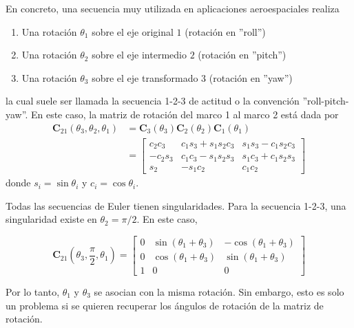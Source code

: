 En concreto, una secuencia muy utilizada en aplicaciones aeroespaciales realiza
\begin{enumerate}
    \item Una rotación $\theta_1$ sobre el eje original $1$ (rotación en ''roll'')
    \item Una rotación $\theta_2$ sobre el eje intermedio $2$ (rotación en ''pitch'')
    \item Una rotación $\theta_3$ sobre el eje transformado $3$ (rotación en ''yaw'')
\end{enumerate}
la cual suele ser llamada la secuencia 1-2-3 de actitud o la convención ''roll-pitch-yaw''. En este caso, la matriz de rotación del marco 1 al marco 2 está dada por
\begin{align}
    \bm{C}_{21}(\theta_3,\theta_2,\theta_1) &= \bm{C}_3(\theta_3)\bm{C}_2(\theta_2)\bm{C}_1(\theta_1) \\
    &=
    \begin{bmatrix}
        c_2c_3 & c_1s_3+s_1s_2c_3 & s_1s_3 - c_1s_2c_3 \\
        -c_2s_3 & c_1c_3 - s_1s_2s_3 & s_1c_3 + c_1s_2s_3 \\
        s_2 & -s_1c_2 & c_1c_2
    \end{bmatrix}
    \label{eq:rpyrotation}
\end{align}
donde $s_i = \sin{\theta_i}$ y $c_i = \cos{\theta_i}$.

Todas las secuencias de Euler tienen singularidades. Para la secuencia 1-2-3, una singularidad existe en $\theta_2 = \pi/2$. En este caso,

\begin{equation}
    \bm{C}_{21}(\theta_3,\frac{\pi}{2},\theta_1) = 
    \begin{bmatrix}
        0 & \sin{(\theta_1 + \theta_3)} & -\cos{(\theta_1 + \theta_3)} \\
        0 & \cos{(\theta_1 + \theta_3)} & \sin{(\theta_1 + \theta_3)} \\
        1 & 0 & 0
    \end{bmatrix}
\end{equation}

Por lo tanto, $\theta_1$ y $\theta_3$ se asocian con la misma rotación. Sin embargo, esto es solo un problema si se quieren recuperar los ángulos de  rotación de la matriz de rotación.

